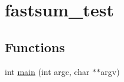 \hypertarget{group__applications__fastsum__test}{
\section{fastsum\_\-test}
\label{group__applications__fastsum__test}
}
\subsection*{Functions}
\begin{CompactItemize}
\item 
\hypertarget{group__applications__fastsum__test_g3c04138a5bfe5d72780bb7e82a18e627}{
int \hyperlink{group__applications__fastsum__test_g3c04138a5bfe5d72780bb7e82a18e627}{main} (int argc, char $\ast$$\ast$argv)}
\label{group__applications__fastsum__test_g3c04138a5bfe5d72780bb7e82a18e627}

\end{CompactItemize}
